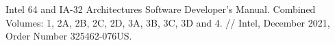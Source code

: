 \renewcommand{\baselinestretch}{1.0}
\begin{thebibliography}{99}


 Intel\textsuperscript{\tiny{\textregistered}} 64 and IA-32 Architectures Software Developer's Manual. Combined Volumes: 1, 2A, 2B, 2C, 2D, 3A, 3B, 3C, 3D and 4. // Intel, December 2021, Order Number 325462-076US.


\end{thebibliography}
